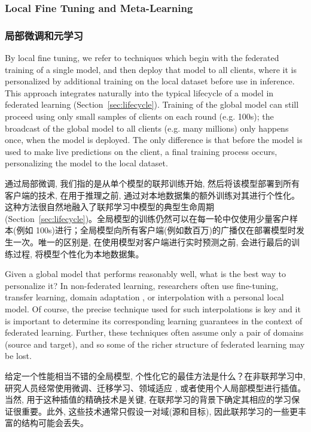 \subsubsection{Local Fine Tuning and Meta-Learning}
\subsubsection*{局部微调和元学习}

By local fine tuning, we refer to techniques which begin with the federated training of a single model, and then deploy that model to all clients, where it is personalized by additional training on the local dataset before use in inference. This approach integrates naturally into the typical lifecycle of a model in federated learning (Section~\ref{sec:lifecycle}). Training of the global model can still proceed using only small samples of clients on each round (e.g. 100s); the broadcast of the global model to all clients (e.g. many millions) only happens once, when the model is deployed. The only difference is that before the model is used to make live predictions on the client, a final training process occurs, personalizing the model to the local dataset.

通过局部微调, 我们指的是从单个模型的联邦训练开始, 然后将该模型部署到所有客户端的技术, 在用于推理之前, 通过对本地数据集的额外训练对其进行个性化。这种方法很自然地融入了联邦学习中模型的典型生命周期(Section~\ref{sec:lifecycle})。全局模型的训练仍然可以在每一轮中仅使用少量客户样本(例如 100s)进行；全局模型向所有客户端(例如数百万)的广播仅在部署模型时发生一次。唯一的区别是, 在使用模型对客户端进行实时预测之前, 会进行最后的训练过程, 将模型个性化为本地数据集。

Given a global model that performs reasonably well, what is the best way to personalize it?  In non-federated learning, researchers often use fine-tuning, transfer learning, domain adaptation \cite{mansour2009domain,cortes2014domain,ben2010theory, mansour2020theory, cortes2020multiple}, or interpolation with a personal local model. Of course, the precise technique used for such interpolations is key and it is important to determine its corresponding learning guarantees in the context of federated learning. Further, these techniques often assume only a pair of domains (source and target), and so some of the richer structure of federated learning may be lost.

给定一个性能相当不错的全局模型, 个性化它的最佳方法是什么？在非联邦学习中, 研究人员经常使用微调、迁移学习、领域适应 \cite{mansour2009domain,cortes2014domain,ben2010theory, mansour2020theory, cortes2020multiple}, 或者使用个人局部模型进行插值。当然, 用于这种插值的精确技术是关键, 在联邦学习的背景下确定其相应的学习保证很重要。此外, 这些技术通常只假设一对域(源和目标), 因此联邦学习的一些更丰富的结构可能会丢失。


